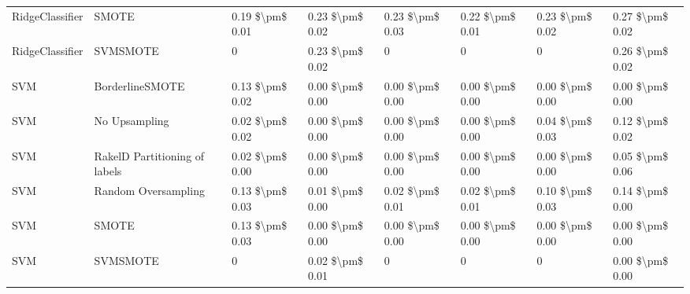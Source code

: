 \begin{tabular}{llllllll}
                RidgeClassifier &                         SMOTE & 0.19 \$\textbackslash pm\$ 0.01 &           0.23 \$\textbackslash pm\$ 0.02 &       0.23 \$\textbackslash pm\$ 0.03 &        0.22 \$\textbackslash pm\$ 0.01 &                         0.23 \$\textbackslash pm\$ 0.02 &     0.27 \$\textbackslash pm\$ 0.02 \\
                RidgeClassifier &                      SVMSMOTE &               0 &           0.23 \$\textbackslash pm\$ 0.02 &                     0 &                      0 &                                       0 &     0.26 \$\textbackslash pm\$ 0.02 \\
                            SVM &               BorderlineSMOTE & 0.13 \$\textbackslash pm\$ 0.02 &           0.00 \$\textbackslash pm\$ 0.00 &       0.00 \$\textbackslash pm\$ 0.00 &        0.00 \$\textbackslash pm\$ 0.00 &                         0.00 \$\textbackslash pm\$ 0.00 &     0.00 \$\textbackslash pm\$ 0.00 \\
                            SVM &                 No Upsampling & 0.02 \$\textbackslash pm\$ 0.02 &           0.00 \$\textbackslash pm\$ 0.00 &       0.00 \$\textbackslash pm\$ 0.00 &        0.00 \$\textbackslash pm\$ 0.00 &                         0.04 \$\textbackslash pm\$ 0.03 &     0.12 \$\textbackslash pm\$ 0.02 \\
                            SVM & RakelD Partitioning of labels & 0.02 \$\textbackslash pm\$ 0.00 &           0.00 \$\textbackslash pm\$ 0.00 &       0.00 \$\textbackslash pm\$ 0.00 &        0.00 \$\textbackslash pm\$ 0.00 &                         0.00 \$\textbackslash pm\$ 0.00 &     0.05 \$\textbackslash pm\$ 0.06 \\
                            SVM &           Random Oversampling & 0.13 \$\textbackslash pm\$ 0.03 &           0.01 \$\textbackslash pm\$ 0.00 &       0.02 \$\textbackslash pm\$ 0.01 &        0.02 \$\textbackslash pm\$ 0.01 &                         0.10 \$\textbackslash pm\$ 0.03 &     0.14 \$\textbackslash pm\$ 0.00 \\
                            SVM &                         SMOTE & 0.13 \$\textbackslash pm\$ 0.03 &           0.00 \$\textbackslash pm\$ 0.00 &       0.00 \$\textbackslash pm\$ 0.00 &        0.00 \$\textbackslash pm\$ 0.00 &                         0.00 \$\textbackslash pm\$ 0.00 &     0.00 \$\textbackslash pm\$ 0.00 \\
                            SVM &                      SVMSMOTE &               0 &           0.02 \$\textbackslash pm\$ 0.01 &                     0 &                      0 &                                       0 &     0.00 \$\textbackslash pm\$ 0.00 \\

\end{tabular}
